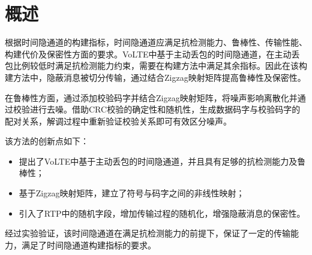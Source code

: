 \section{概述}
\label{chap:zigzag:overview}

根据时间隐通道的构建指标，时间隐通道应满足抗检测能力、鲁棒性、传输性能、构建代价及保密性方面的要求。VoLTE中基于主动丢包的时间隐通道，在主动丢包比例较低时满足抗检测能力约束，需要在构建方法中满足其余指标。因此在该构建方法中，隐蔽消息被切分传输，通过结合Zigzag映射矩阵提高鲁棒性及保密性。

在鲁棒性方面，通过添加校验码字并结合Zigzag映射矩阵，将噪声影响离散化并通过校验进行去噪。借助CRC校验的确定性和随机性，生成数据码字与校验码字的配对关系，解调过程中重新验证校验关系即可有效区分噪声。

该方法的创新点如下：
\begin{itemize}
	\item 提出了VoLTE中基于主动丢包的时间隐通道，并且具有足够的抗检测能力及鲁棒性；
	\item 基于Zigzag映射矩阵，建立了符号与码字之间的非线性映射；
	\item 引入了RTP中的随机字段，增加传输过程的随机化，增强隐蔽消息的保密性。
\end{itemize}

经过实验验证，该时间隐通道在满足抗检测能力的前提下，保证了一定的传输能力，满足了时间隐通道构建指标的要求。